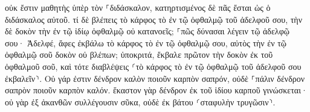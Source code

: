\documentclass{openreader}
\begin{document}
οὐκ ἔστιν μαθητὴς ὑπὲρ τὸν ⸀διδάσκαλον, κατηρτισμένος δὲ πᾶς ἔσται ὡς ὁ διδάσκαλος αὐτοῦ. 
τί δὲ βλέπεις τὸ κάρφος τὸ ἐν τῷ ὀφθαλμῷ τοῦ ἀδελφοῦ σου, τὴν δὲ δοκὸν τὴν ἐν τῷ ἰδίῳ ὀφθαλμῷ οὐ κατανοεῖς; 
⸀πῶς δύνασαι λέγειν τῷ ἀδελφῷ σου· Ἀδελφέ, ἄφες ἐκβάλω τὸ κάρφος τὸ ἐν τῷ ὀφθαλμῷ σου, αὐτὸς τὴν ἐν τῷ ὀφθαλμῷ σοῦ δοκὸν οὐ βλέπων; ὑποκριτά, ἔκβαλε πρῶτον τὴν δοκὸν ἐκ τοῦ ὀφθαλμοῦ σοῦ, καὶ τότε διαβλέψεις ⸂τὸ κάρφος τὸ ἐν τῷ ὀφθαλμῷ τοῦ ἀδελφοῦ σου ἐκβαλεῖν⸃. 
Οὐ γάρ ἐστιν δένδρον καλὸν ποιοῦν καρπὸν σαπρόν, οὐδὲ ⸀πάλιν δένδρον σαπρὸν ποιοῦν καρπὸν καλόν. 
ἕκαστον γὰρ δένδρον ἐκ τοῦ ἰδίου καρποῦ γινώσκεται· οὐ γὰρ ἐξ ἀκανθῶν συλλέγουσιν σῦκα, οὐδὲ ἐκ βάτου ⸂σταφυλὴν τρυγῶσιν⸃. 
\end{document}
